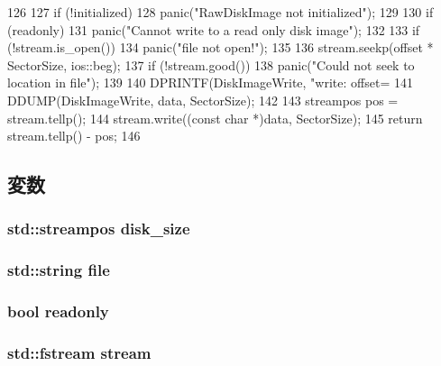 \begin{DoxyCode}
126 {
127     if (!initialized)
128         panic("RawDiskImage not initialized");
129 
130     if (readonly)
131         panic("Cannot write to a read only disk image");
132 
133     if (!stream.is_open())
134         panic("file not open!\n");
135 
136     stream.seekp(offset * SectorSize, ios::beg);
137     if (!stream.good())
138         panic("Could not seek to location in file");
139 
140     DPRINTF(DiskImageWrite, "write: offset=%
141     DDUMP(DiskImageWrite, data, SectorSize);
142 
143     streampos pos = stream.tellp();
144     stream.write((const char *)data, SectorSize);
145     return stream.tellp() - pos;
146 }
\end{DoxyCode}


\subsection{変数}
\hypertarget{classRawDiskImage_a242120545024c17e9854e58aa7496c08}{
\subsubsection[{disk\_\-size}]{\setlength{\rightskip}{0pt plus 5cm}std::streampos {\bf disk\_\-size}}}
\label{classRawDiskImage_a242120545024c17e9854e58aa7496c08}
\hypertarget{classRawDiskImage_aefc35c7944eed319c89bc1b399f0eb67}{
\subsubsection[{file}]{\setlength{\rightskip}{0pt plus 5cm}std::string {\bf file}}}
\label{classRawDiskImage_aefc35c7944eed319c89bc1b399f0eb67}
\hypertarget{classRawDiskImage_ae04692b1a934bc6b8c48b43c95add0fa}{
\subsubsection[{readonly}]{\setlength{\rightskip}{0pt plus 5cm}bool {\bf readonly}}}
\label{classRawDiskImage_ae04692b1a934bc6b8c48b43c95add0fa}
\hypertarget{classRawDiskImage_a8858ebba853bebec63897a055877c296}{
\subsubsection[{stream}]{\setlength{\rightskip}{0pt plus 5cm}std::fstream {\bf stream}}}
\label{classRawDiskImage_a8858ebba853bebec63897a055877c296}


